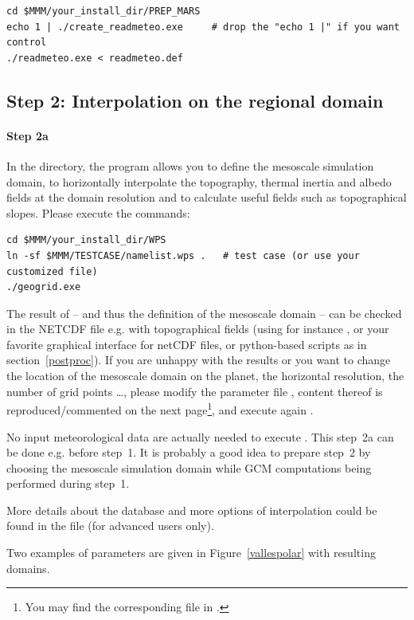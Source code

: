 \begin{verbatim}
cd $MMM/your_install_dir/PREP_MARS
echo 1 | ./create_readmeteo.exe     # drop the "echo 1 |" if you want control
./readmeteo.exe < readmeteo.def
\end{verbatim}

\sk
\subsection{Step 2: Interpolation on the regional domain}\label{wps}

\sk
\paragraph{Step 2a} In the  directory, the  program allows you to define the mesoscale simulation domain, to horizontally interpolate the topography, thermal inertia and albedo fields at the domain resolution and to calculate useful fields such as topographical slopes. Please execute the commands:

\begin{verbatim}
cd $MMM/your_install_dir/WPS
ln -sf $MMM/TESTCASE/namelist.wps .   # test case (or use your customized file)
./geogrid.exe
\end{verbatim}

The result of  -- and thus the definition of the mesoscale domain -- can be checked in the NETCDF file  e.g. with topographical fields    (using for instance , or your favorite graphical interface for netCDF files, or python-based scripts as in section~\ref{postproc}). If you are unhappy with the results or you want to change the location of the mesoscale domain on the planet, the horizontal resolution, the number of grid points \ldots, please modify the parameter file , content thereof is reproduced/commented on the next page\footnote{You may find the corresponding file in .}, and execute again . 

\begin{finger}
\item No input meteorological data are actually needed to execute . This step~2a can be done e.g. before step~1. It is probably a good idea to prepare step~2 by choosing the mesoscale simulation domain while GCM computations being performed during step~1. 
\item More details about the database and more options of interpolation could be found in the file  (for advanced users only).
\item Two examples of  parameters are given in Figure~\ref{vallespolar} with resulting domains.
\end{finger}

